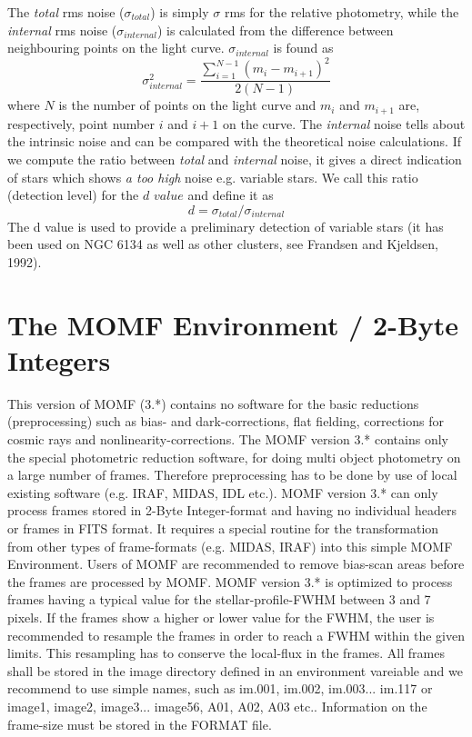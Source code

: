 \documentclass[]{article}
\begin{document}
The {\em total} rms noise ($\sigma _{total}$) is simply $\sigma$ rms 
for
the relative photometry,
while the {\em internal} rms noise ($\sigma _{internal}$) is 
calculated 
from the difference between neighbouring points on the light curve.
$\sigma _{internal}$ is found as
\begin{equation}
\sigma ^{2} _{internal} =  \frac {\sum _{i=1} ^ {N-1} ( m_{i} - m_{i+1}
) ^{2} } {2(N-1)}
\end{equation}
where $N$ is the number of points on the light curve and $m_{i}$ 
and
$m_{i+1}$ are, respectively, point number $i$ and $i+1$ on the curve.
The {\em internal} noise tells about the intrinsic noise and can be
compared with the theoretical noise calculations.
If we compute the ratio between {\em total} and {\em internal} 
noise, it gives
a direct indication of stars which shows {\em a too high} noise e.g.
variable stars. We call this ratio (detection level) for the $d$ $value$
and define it as
\begin{equation}
d = \sigma _{total} /  \sigma _{internal}   
\end{equation}
The d value is used to provide a preliminary detection of variable
stars (it has been used on NGC 6134 as well as other clusters, see
Frandsen and Kjeldsen, 1992).
\section{The MOMF Environment / 2-Byte Integers}
This version of MOMF (3.*) contains no software for the basic reductions
(preprocessing) such as bias- and dark-corrections, flat fielding,
corrections for cosmic rays and nonlinearity-corrections. The MOMF
version 3.* contains only the special photometric reduction software,
for doing multi object photometry on a large number of frames. Therefore
preprocessing has to be done by use of local existing software (e.g.
IRAF, MIDAS, IDL etc.). MOMF version 3.* can only process frames stored
in 2-Byte Integer-format and having no individual headers or frames in FITS
format. It
requires a special routine for the transformation from other types of
frame-formats (e.g. MIDAS, IRAF) into this simple MOMF Environment.
Users of MOMF are recommended to remove bias-scan areas before the
frames are processed by MOMF. MOMF version 3.* is optimized to process
frames having a typical value for the stellar-profile-FWHM between 3 and
7 pixels. If the frames show a higher or lower value for the FWHM, the
user is recommended to resample the frames in order to reach a FWHM
within the given limits. This resampling has to conserve the local-flux
in the frames. All frames shall be stored in the image directory
defined in an environment vareiable and
we recommend to use simple names, such as im.001, im.002, im.003... im.117 or
image1, image2, image3... image56, A01, A02, A03 etc..
Information
on the frame-size must be stored in the FORMAT file.
\vspace{4mm}
\end{document}
